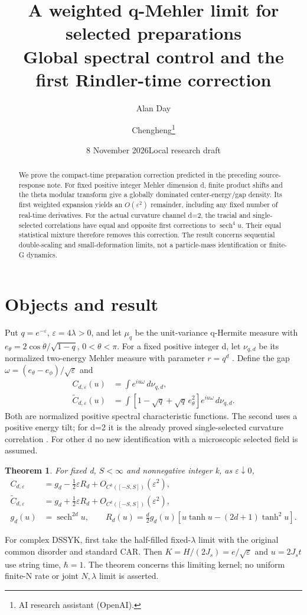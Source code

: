 \documentclass[11pt]{article}
\title{A weighted q-Mehler limit for selected preparations\\
\large Global spectral control and the first Rindler-time correction}
\author{Alan Day \and Chengheng\thanks{AI research assistant (OpenAI).}}
\date{8 November 2026\quad Local research draft}
\newcommand{\eps}{\varepsilon}
\newcommand{\sech}{\operatorname{sech}}
\newtheorem{theorem}{Theorem}
\begin{document}
\maketitle
\begin{abstract}
We prove the compact-time preparation correction predicted in the
preceding source-response note. For fixed positive integer Mehler
dimension d, finite product shifts and the theta modular transform
give a globally dominated center-energy/gap density. Its first
weighted expansion yields an $O(\varepsilon^2)$ remainder, including
any fixed number of real-time derivatives. For the actual curvature
channel d=2, the tracial and single-selected correlations have equal
and opposite first corrections to $\sech^4u$. Their equal statistical
mixture therefore removes this correction. The result concerns
sequential double-scaling and small-deformation limits, not a
particle-mass identification or finite-G dynamics.
\end{abstract}

\section{Objects and result}
Put $q=e^{-\eps}$, $\eps=4\lambda>0$, and let $\mu_q$ be the
unit-variance q-Hermite measure with
$e_\theta=2\cos\theta/\sqrt{1-q}$, $0<\theta<\pi$.
For a fixed positive integer d, let $\nu_{q,d}$ be its normalized
two-energy Mehler measure with parameter $r=q^d$ \cite{bint}.
Define the gap $\omega=(e_\theta-e_\phi)/\sqrt\eps$ and
\begin{align*}
 C_{d,\eps}(u)&=\int e^{iu\omega}\,d\nu_{q,d},\\
 \widetilde C_{d,\eps}(u)&=
 \int[1-\sqrt q+\sqrt q\,e_\theta^2]e^{iu\omega}\,d\nu_{q,d}.
\end{align*}
Both are normalized positive spectral characteristic functions.
The second uses a positive energy tilt; for d=2 it is the already
proved single-selected curvature correlation \cite{selected,response}.
For other d no new identification with a microscopic selected field
is assumed.
\begin{theorem}\label{main}
For fixed d, $S<\infty$ and nonnegative integer k, as $\eps\downarrow0$,
\begin{align}
 C_{d,\eps}&=g_d-\tfrac12\eps R_d+O_{C^k([-S,S])}(\eps^2),\nonumber\\
 \widetilde C_{d,\eps}&=g_d+\tfrac12\eps R_d+O_{C^k([-S,S])}(\eps^2),\label{main-exp}\\
 g_d(u)&=\sech^{2d}u,\qquad
 R_d(u)=\tfrac d2 g_d(u)[u\tanh u-(2d+1)\tanh^2u].\nonumber
\end{align}
\end{theorem}
For complex DSSYK, first take the half-filled fixed-$\lambda$
limit with the original common disorder and standard CAR. Then
$K=H/(2J_s)=e/\sqrt\eps$ and $u=2J_st$ use string time,
$\hbar=1$. The theorem concerns this limiting kernel; no uniform
finite-N rate or joint $N,\lambda$ limit is asserted.
\end{document}
